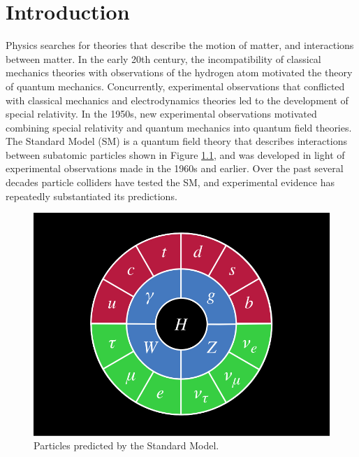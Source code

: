 \chapter{Introduction}
\label{intro_chapter}

Physics searches for theories that describe the motion of matter, and interactions between matter.  
In the early 20th century, the incompatibility of classical mechanics theories with 
observations of the hydrogen atom motivated the theory of quantum mechanics.  Concurrently, experimental 
observations that conflicted with classical mechanics and electrodynamics theories led to the development 
of special relativity.  In the 1950s, new experimental observations motivated combining special 
relativity and quantum mechanics into quantum field theories.  The Standard Model (SM) \cite{weinbergSM,salamSM} 
is a quantum field theory that describes interactions between subatomic particles shown in Figure \ref{fig:structureOfSM}, 
and was developed in light of experimental observations made in the 1960s and earlier.  Over the past 
several decades particle colliders have tested the SM, and experimental evidence has repeatedly 
substantiated its predictions.

\begin{figure}[h]
	\centering
	\includegraphics[width=1.0\textwidth]{figures/SM_particles_circularRep.png}
	\caption{Particles predicted by the Standard Model.}
	\label{fig:structureOfSM}
\end{figure}

